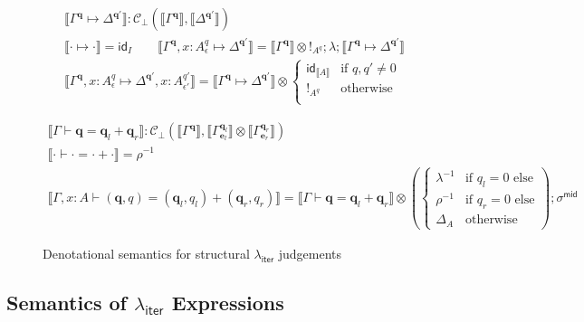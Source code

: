 \documentclass[acmsmall,screen,review]{acmart}
\newcommand{\mc}[1]{\ensuremath{\mathcal{#1}}}
\newcommand{\mb}[1]{\ensuremath{\mathbf{#1}}}
\newcommand{\ms}[1]{\ensuremath{\mathsf{#1}}}
\newcommand{\qsp}[4]{#1 \vdash #2 = #3 + #4}
\newcommand{\cwk}[2]{#1 \mapsto #2}
\newcommand{\dnt}[1]{\llbracket{#1}\rrbracket}
\newcommand{\subiterexp}{\texorpdfstring{\(\lambda_{\ms{iter}}\)}{lambda-iter}}
\begin{document}
\begin{figure}
  \begin{gather*}
    \boxed{\dnt{\cwk{\Gamma^{\mb{q}}}{\Delta^{\mb{q}'}}} 
      : \mc{C}_\bot(\dnt{\Gamma^{\mb{q}}}, \dnt{\Delta^{\mb{q}'}})} \\
    \dnt{\cwk{\cdot}{\cdot}} = \ms{id}_I \qquad
    \dnt{\cwk{\Gamma^{\mb{q}}, x : A^q_\epsilon}{\Delta^{\mb{q}'}}}
      = \dnt{\Gamma^{\mb{q}}} \otimes !_{A^q}
      ; \lambda
      ; \dnt{\cwk{\Gamma^{\mb{q}}}{\Delta^{\mb{q}'}}} \\
    \dnt{\cwk{\Gamma^{\mb{q}}, x : A^q_\epsilon}
              {\Delta^{\mb{q}'}, x : A^{q'}_{\epsilon'}}}
      = \dnt{\cwk{\Gamma^{\mb{q}}}{\Delta^{\mb{q}'}}} \otimes \begin{cases}
        \ms{id}_{\dnt{A}} & \text{if } q, q' \neq 0 \\
        !_{A^q} & \text{otherwise} \\
      \end{cases}
  \end{gather*}

  \begin{gather*}
    \boxed{\dnt{\qsp{\Gamma}{\mb{q}}{\mb{q}_l}{\mb{q}_r}} 
      : \mc{C}_\bot(\dnt{\Gamma^{\mb{q}}}, 
        \dnt{\Gamma^{\mb{q}_l}_{\mb{e}_l}} \otimes \dnt{\Gamma^{\mb{q}_r}_{\mb{e}_r}})} 
    \\
    \dnt{\qsp{\cdot}{\cdot}{\cdot}{\cdot}} = \rho^{-1}
    \\
    \dnt{\qsp{\Gamma, x : A}{(\mb{q}, q)}{(\mb{q}_l, q_l)}{(\mb{q}_r, q_r)}}
    = \dnt{\qsp{\Gamma}{\mb{q}}{\mb{q}_l}{\mb{q}_r}} \otimes
    \left(\begin{cases}
      \lambda^{-1} & \text{if } q_l = 0 \text{ else} \\
      \rho^{-1} & \text{if } q_r = 0 \text{ else} \\
      \Delta_A & \text{otherwise}
    \end{cases}\right) 
    ; \sigma^{\ms{mid}}
  \end{gather*}
  \caption{Denotational semantics for structural \subiterexp{} judgements}
  \Description{}
  \label{fig:struct-sem}
\end{figure}

\subsection{Semantics of \subiterexp{} Expressions}
\end{document}
